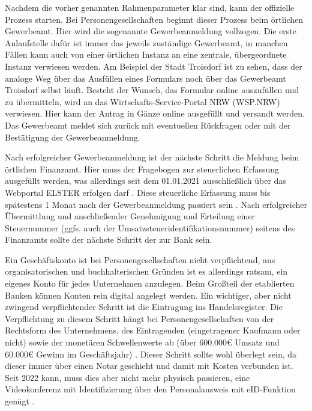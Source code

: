 Nachdem die vorher genannten Rahmenparameter klar sind, kann der offizielle Prozess starten. Bei Personengesellschaften beginnt dieser Prozess beim örtlichen Gewerbeamt. Hier wird die sogenannte Gewerbeanmeldung vollzogen. Die erste Anlaufstelle dafür ist immer das jeweils zuständige Gewerbeamt, in manchen Fällen kann auch von einer örtlichen Instanz an eine zentrale, übergeordnete Instanz verwiesen werden. Am Beispiel der Stadt Troisdorf ist zu sehen, dass der analoge Weg über das Ausfüllen eines Formulars noch über das Gewerbeamt Troisdorf selbst läuft. Besteht der Wunsch, das Formular online auszufüllen und zu übermitteln, wird an das Wirtschafts-Service-Portal NRW (WSP.NRW) verwiesen. Hier kann der Antrag in Gänze online ausgefüllt und versandt werden. Das Gewerbeamt meldet sich zurück mit eventuellen Rückfragen oder mit der Bestätigung der Gewerbeanmeldung. 

Nach erfolgreicher Gewerbeanmeldung ist der nächste Schritt die Meldung beim örtlichen Finanzamt. Hier muss der Fragebogen zur steuerlichen Erfassung ausgefüllt werden, was allerdings seit dem 01.01.2021 ausschließlich über das Webportal ELSTER erfolgen darf . Diese steuerliche Erfassung muss bis spätestens 1 Monat nach der Gewerbeanmeldung passiert sein . Nach erfolgreicher Übermittlung und anschließender Genehmigung und Erteilung einer Steuernummer (ggfs. auch der Umsatzsteueridentifikationsnummer) seitens des Finanzamts sollte der nächste Schritt der zur Bank sein. 

Ein Geschäftskonto ist bei Personengesellschaften nicht verpflichtend, aus organisatorischen und buchhalterischen Gründen ist es allerdings ratsam, ein eigenes Konto für jedes Unternehmen anzulegen. Beim Großteil der etablierten Banken können Konten rein digital angelegt werden. Ein wichtiger, aber nicht zwingend verpflichtender Schritt ist die Eintragung ins Handelsregister. Die Verpflichtung zu diesem Schritt hängt bei Personengesellschaften von der Rechtsform des Unternehmens, des Eintragenden (eingetragener Kaufmann oder nicht) sowie der monetären Schwellenwerte ab (über 600.000€ Umsatz und 60.000€ Gewinn im Geschäftsjahr) . Dieser Schritt sollte wohl überlegt sein, da dieser immer über einen Notar geschieht und damit mit Kosten verbunden ist. Seit 2022 kann, muss dies aber nicht mehr physisch passieren, eine Videokonferenz mit Identifizierung über den Personalausweis mit eID-Funktion genügt . 

